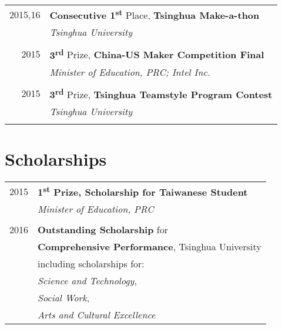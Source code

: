 \documentclass[10pt]{article} %
\begin{document}
{\begin{minipage}[t]{0.5\textwidth}
\begin{tabular}{rl}
2015,16	 & \textbf{Consecutive 1\textsuperscript{st}} Place, \textbf{Tsinghua Make-a-thon}\\
& \textit{Tsinghua University}\\ \\

2015	 & \textbf{3\textsuperscript{rd}} Prize, \textbf{China-US Maker Competition Final}\\
& \textit{Minister of Education, PRC; Intel Inc.}\\ \\

2015	 & \textbf{3\textsuperscript{rd}} Prize, \textbf{Tsinghua Teamstyle Program Contest}\\
& \textit{Tsinghua University}\\ \\

\end{tabular}


\section{Scholarships} 

\begin{tabular}{rl}

2015 & \textbf{1\textsuperscript{st} Prize, Scholarship for Taiwanese Student}\\
& \textit{Minister of Education, PRC}\\ \\

2016 & \textbf{Outstanding Scholarship} for \\
& \textbf{Comprehensive Performance}, Tsinghua University\\
& including scholarships for:\\
& \textit{            Science and Technology}, \\
& \textit{            Social Work},\\
& \textit{            Arts and Cultural Excellence}

\end{tabular}


\end{minipage}}
\end{document}
